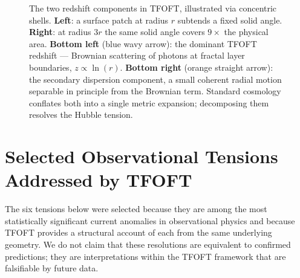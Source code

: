 \documentclass[11pt,a4paper]{article}
\begin{document}
\begin{figure}[h]
\caption{The two redshift components in TFOFT, illustrated via concentric shells.
  \textbf{Left}: a surface patch at radius $r$ subtends a fixed solid angle.
  \textbf{Right}: at radius $3r$ the same solid angle covers $9\times$ the physical area.
  \textbf{Bottom left} (blue wavy arrow): the dominant TFOFT redshift --- Brownian scattering of photons at fractal layer boundaries, $z\propto\ln(r)$.
  \textbf{Bottom right} (orange straight arrow): the secondary dispersion component, a small coherent radial motion separable in principle from the Brownian term.
  Standard cosmology conflates both into a single metric expansion; decomposing them resolves the Hubble tension.}
\label{fig:expansion_dispersion}
\end{figure}


\section{Selected Observational Tensions Addressed by TFOFT}
\label{sec:tensions}

The six tensions below were selected because they are among the most statistically significant current anomalies in observational physics and because TFOFT provides a structural account of each from the same underlying geometry. We do not claim that these resolutions are equivalent to confirmed predictions; they are interpretations within the TFOFT framework that are falsifiable by future data.
\end{document}
